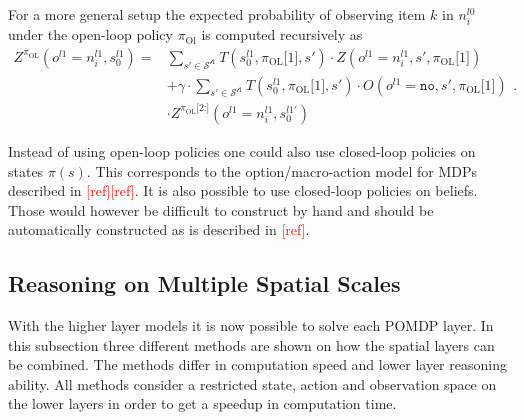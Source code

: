 For a more general setup the expected probability of observing item $k$ in $n_i^{l0}$ under the open-loop policy $\pi_\text{Ol}$ is computed recursively as
\begin{equation}
    \begin{aligned}
        Z^{\pi_\text{OL}}\left( o^{l1}=n_i^{l1}, s_0^{l1}\right) = &\sum_{s'\in\mathcal{S^{l1}}} T\left( s_0^{l1}, \pi_\text{OL}\texttt{[$1$]}, s' \right) \cdot Z\left(o^{l1}=n_i^{l1}, s', \pi_\text{OL}\texttt{[$1$]}\right) \\
        &+ \gamma \cdot \sum_{s'\in\mathcal{S^{l1}}} T\left( s_0^{l1}, \pi_\text{OL}\texttt{[$1$]}, s' \right) \cdot O\left( o^{l1}=\texttt{no}, s', \pi_\text{OL}\texttt{[$1$]} \right)\\
        &\cdot Z^{\pi_\text{OL}\texttt{[$2$:]}}\left( o^{l1}=n_i^{l1}, s_0^{l1'} \right)
    \end{aligned}.
\end{equation}

Instead of using open-loop policies one could also use closed-loop policies on states $\pi(s)$. This corresponds to the option/macro-action model for MDPs described in \textcolor{red}{[ref][ref]}. It is also possible to use closed-loop policies on beliefs. Those would however be difficult to construct by hand and should be automatically constructed as is described in \textcolor{red}{[ref]}.


\subsection{Reasoning on Multiple Spatial Scales}
With the higher layer models it is now possible to solve each POMDP layer. In this subsection three different methods are shown on how the spatial layers can be combined. The methods differ in computation speed and lower layer reasoning ability. 
All methods consider a restricted state, action and observation space on the lower layers in order to get a speedup in computation time. 
%
